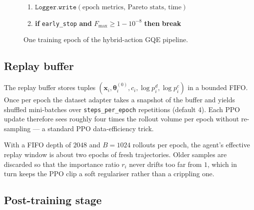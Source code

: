 \documentclass[11pt,a4paper]{article}
\begin{document}
\begin{figure}[H]
{\begin{minipage}{0.95\linewidth}
\begin{enumerate}[leftmargin=2em, label=\textbf{\arabic*.}]
\begin{itemize}[leftmargin=1em, label={}]
\begin{itemize}[leftmargin=2em, label={}]
          \item $\mathcal{L} \gets \texttt{PPOLoss}(\mathcal{B}, \beta)$ \quad
                \textit{// eq.~\eqref{eq:ppo-clipped}}
          \item $\bm{\phi} \gets \bm{\phi} - \eta\,\nabla_{\bm{\phi}}\mathcal{L}$
                \quad \textit{// AdamW, gradient-norm clipped}
        \end{itemize}
    \end{itemize}
  \item $\texttt{Logger.write}(\text{epoch metrics, Pareto stats, time})$
  \item \textbf{if} \texttt{early\_stop} \textbf{and} $F_{\max} \ge 1 - 10^{-8}$ \textbf{then} \textbf{break}
\end{enumerate}
\end{minipage}}
\caption{One training epoch of the hybrid-action GQE pipeline.}
\label{alg:epoch}
\end{figure}

\subsection{Replay buffer}

The replay buffer stores tuples $(\bm{x}_i, \bm{\theta}^{(0)}_i, c_i, \log p^d_i, \log p^c_i)$ in a bounded FIFO. Once per epoch the dataset adapter takes a snapshot of the buffer and yields shuffled mini-batches over \texttt{steps\_per\_epoch} repetitions (default $4$). Each PPO update therefore sees roughly four times the rollout volume per epoch without re-sampling --- a standard PPO data-efficiency trick.

With a FIFO depth of $2048$ and $B = 1024$ rollouts per epoch, the agent's effective replay window is about two epochs of fresh trajectories. Older samples are discarded so that the importance ratio $r_i$ never drifts too far from $1$, which in turn keeps the PPO clip a soft regulariser rather than a crippling one.

\subsection{Post-training stage}
\end{document}
